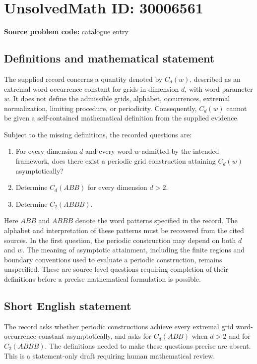 \documentclass[11pt]{article}
\begin{document}
\section*{UnsolvedMath ID: 30006561}
\textbf{Source problem code:} catalogue entry
\subsection{Definitions and mathematical statement}
The supplied record concerns a quantity denoted by \(C_d(w)\), described as an extremal word-occurrence constant for grids in dimension \(d\), with word parameter \(w\). It does not define the admissible grids, alphabet, occurrences, extremal normalization, limiting procedure, or periodicity. Consequently, \(C_d(w)\) cannot be given a self-contained mathematical definition from the supplied evidence.

Subject to the missing definitions, the recorded questions are:
\begin{enumerate}
\item For every dimension \(d\) and every word \(w\) admitted by the intended framework, does there exist a periodic grid construction attaining \(C_d(w)\) asymptotically?
\item Determine \(C_d(ABB)\) for every dimension \(d>2\).
\item Determine \(C_2(ABBB)\).
\end{enumerate}
Here \(ABB\) and \(ABBB\) denote the word patterns specified in the record. The alphabet and interpretation of these patterns must be recovered from the cited sources. In the first question, the periodic construction may depend on both \(d\) and \(w\). The meaning of asymptotic attainment, including the finite regions and boundary conventions used to evaluate a periodic construction, remains unspecified. These are source-level questions requiring completion of their definitions before a precise mathematical formulation is possible.
\subsection{Short English statement}
The record asks whether periodic constructions achieve every extremal grid word-occurrence constant asymptotically, and asks for \(C_d(ABB)\) when \(d>2\) and for \(C_2(ABBB)\). The definitions needed to make these questions precise are absent. This is a statement-only draft requiring human mathematical review.
\end{document}

